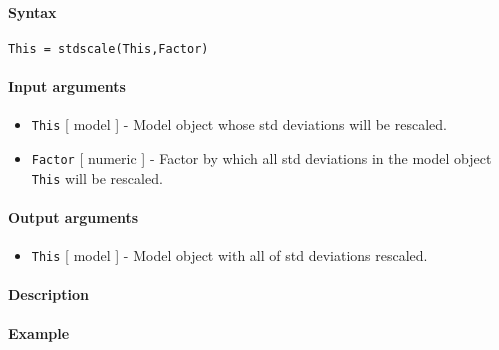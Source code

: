 


	\paragraph{Syntax}

\begin{verbatim}
This = stdscale(This,Factor)
\end{verbatim}

\paragraph{Input arguments}

\begin{itemize}
\item
  \texttt{This} {[} model {]} - Model object whose std deviations will
  be rescaled.
\item
  \texttt{Factor} {[} numeric {]} - Factor by which all std deviations
  in the model object \texttt{This} will be rescaled.
\end{itemize}

\paragraph{Output arguments}

\begin{itemize}
\itemsep1pt\parskip0pt
\item
  \texttt{This} {[} model {]} - Model object with all of std deviations
  rescaled.
\end{itemize}

\paragraph{Description}

\paragraph{Example}



